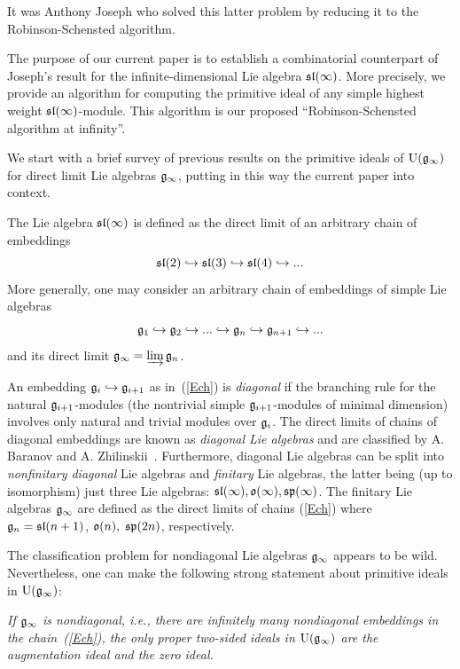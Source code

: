 \documentclass[10pt]{amsart}\oddsidemargin -1mm \evensidemargin -1mm \topmargin -15mm\headheight5mm \headsep 3.5mm \textheight 245mm\textwidth 170mm
\theoremstyle{definition}\newtheorem{theorem}{Theorem}[section]\newtheorem{lemma}[theorem]{Lemma}\newtheorem{remark}[theorem]{Remark}\newtheorem{proposition}[theorem]{Proposition}\newtheorem{corollary}[theorem]{Corollary}\newtheorem{definition}[theorem]{Definition}\newtheorem{Ex}[theorem]{Example}\newtheorem{obs}[theorem]{Observation}\newtheorem{nota}[theorem]{Notation}
\begin{document}
It was Anthony Joseph who solved this latter problem by reducing it to the Robinson-Schensted algorithm.

The purpose of our current paper is to establish a combinatorial counterpart of Joseph's result for the infinite-dimensional Lie algebra $\frak{sl}(\infty)$. 
More precisely, we provide an algorithm for computing the primitive ideal of any simple highest weight $\frak{sl}(\infty)$-module. 
This algorithm is our proposed ``Robinson-Schensted algorithm at infinity''.

We start with a brief survey of previous results on the primitive ideals of ${\rm U}(\frak g_\infty)$ for direct limit Lie algebras $\frak g_\infty$, putting in this way the current paper into context. 

The Lie algebra $\frak{sl}(\infty)$ is defined as the direct limit of an arbitrary chain of embeddings
$$\frak{sl}(2)\hookrightarrow\frak{sl}(3)\hookrightarrow\frak{sl}(4)\hookrightarrow...$$
More generally, one may consider an arbitrary chain of embeddings of simple Lie algebras
\begin{equation}\frak g_1\hookrightarrow\frak g_2\hookrightarrow...\hookrightarrow\frak g_n\hookrightarrow\frak g_{n+1}\hookrightarrow...\label{Ech}\end{equation}
and its direct limit $\frak g_\infty=\varinjlim \frak g_n$. 

An embedding $\frak g_i\hookrightarrow\frak g_{i+1}$ as in~(\ref{Ech}) is {\it diagonal} if the branching rule for the natural $\frak g_{i+1}$-modules (the nontrivial simple $\frak g_{i+1}$-modules of minimal dimension) involves only natural and trivial modules over $\frak g_i$. The direct limits of chains of diagonal embeddings are known as {\it diagonal Lie algebras} and are classified by A. Baranov and A. Zhilinskii~\cite{BZh}. 
Furthermore, diagonal Lie algebras can be split into {\it nonfinitary diagonal} Lie algebras and {\it finitary} Lie algebras, the latter being (up to isomorphism) just three Lie algebras: $\frak{sl}(\infty), \frak o(\infty), \frak{sp}(\infty)$. 
The finitary  Lie algebras $\frak g_\infty$ are defined as the direct limits of chains (\ref{Ech}) where $\frak g_n=\frak{sl}(n+1)$, $\frak o(n),$ $\frak{sp}(2n)$, respectively. 

The classification problem for nondiagonal Lie algebras $\frak g_\infty$ appears to be wild. Nevertheless, one can make the following strong statement about primitive ideals in ${\rm U}(\frak g_\infty)$:

{\it If $\frak g_\infty$ is nondiagonal, i.e., there are infinitely many nondiagonal embeddings in the chain~(\ref{Ech}), the only proper two-sided ideals in ${\rm U}(\frak g_\infty)$ are the augmentation ideal and the zero ideal. }
\end{document}
